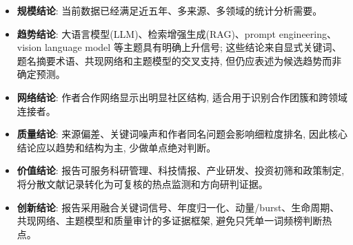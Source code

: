 \begin{itemize}
  \item \textbf{规模结论}: 当前数据已经满足近五年、多来源、多领域的统计分析需要。
  \item \textbf{趋势结论}: 大语言模型(LLM)、检索增强生成(RAG)、prompt engineering、vision language model 等主题具有明确上升信号; 这些结论来自显式关键词、题名摘要术语、共现网络和主题模型的交叉支持, 但仍应表述为候选趋势而非确定预测。
  \item \textbf{网络结论}: 作者合作网络显示出明显社区结构, 适合用于识别合作团簇和跨领域连接者。
  \item \textbf{质量结论}: 来源偏差、关键词噪声和作者同名问题会影响细粒度排名, 因此核心结论应以趋势和结构为主, 少做单点绝对判断。
  \item \textbf{价值结论}: 报告可服务科研管理、科技情报、产业研发、投资初筛和政策制定, 将分散文献记录转化为可复核的热点监测和方向研判证据。
  \item \textbf{创新结论}: 报告采用融合关键词信号、年度归一化、动量/burst、生命周期、共现网络、主题模型和质量审计的多证据框架, 避免只凭单一词频榜判断热点。
\end{itemize}

\clearpage
